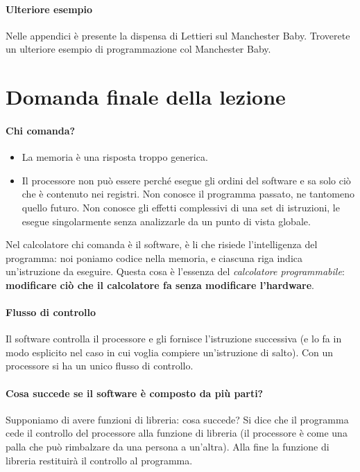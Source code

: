 \paragraph{Ulteriore esempio} Nelle appendici è presente la dispensa di Lettieri sul Manchester Baby. Troverete un ulteriore esempio di programmazione col Manchester Baby.
\clearpage
\section{Domanda finale della lezione}
\paragraph{Chi comanda?}
\begin{itemize}
	\item La memoria è una risposta troppo generica.
	\item Il processore non può essere perché esegue gli ordini del software e sa solo ciò che è contenuto nei registri. Non conosce il programma passato, ne tantomeno quello futuro. Non conosce gli effetti complessivi di una set di istruzioni, le esegue singolarmente senza analizzarle da un punto di vista globale.
\end{itemize}
Nel calcolatore chi comanda è il software, è li che risiede l'intelligenza del programma: noi poniamo codice nella memoria, e ciascuna riga indica un'istruzione da eseguire. Questa cosa è l'essenza del \emph{calcolatore programmabile}:  \textbf{modificare ciò che il calcolatore fa senza modificare l'hardware}.
\paragraph{Flusso di controllo} Il software controlla il processore e gli fornisce l'istruzione successiva (e lo fa in modo esplicito nel caso in cui voglia compiere un'istruzione di salto). Con un processore si ha un unico flusso di controllo.
\paragraph{Cosa succede se  il software è composto da più parti?} Supponiamo di avere funzioni di libreria: cosa succede? Si dice che il programma cede il controllo del processore alla funzione di libreria (il processore è come una palla che può rimbalzare da una persona a un'altra). Alla fine la funzione di libreria restituirà il controllo al programma.